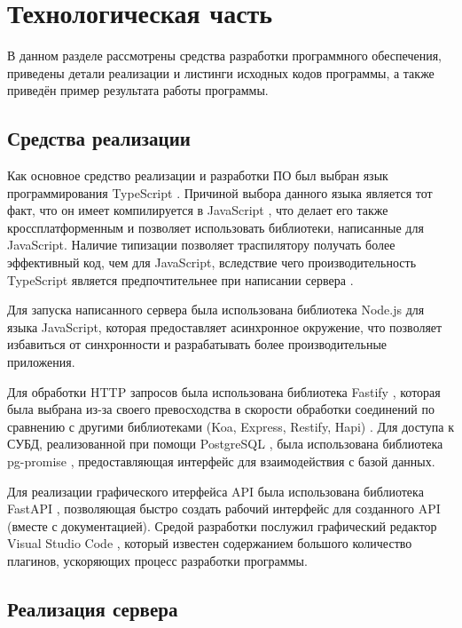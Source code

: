 \section{Технологическая часть}

В  данном  разделе  рассмотрены  средства  разработки  программного
обеспечения, приведены детали реализации и листинги исходных кодов
программы, а также приведён пример результата работы программы.

\subsection{Средства реализации}
Как  основное  средство  реализации  и  разработки  ПО  был  выбран  язык
программирования  TypeScript \cite{ts}.
Причиной  выбора  данного  языка  является  тот факт,  что  он  имеет компилируется в JavaScript \cite{js}, что делает его также кроссплатформенным и позволяет использовать библиотеки, написанные для JavaScript. 
Наличие типизации позволяет траспилятору получать более эффективный код, чем для JavaScript, вследствие чего производительность TypeScript является предпочтительнее при написании сервера \cite{ts-vs-js}.

Для запуска написанного сервера была использована библиотека Node.js \cite{nodejs} для языка JavaScript, которая предоставляет асинхронное окружение, что позволяет избавиться от синхронности и разрабатывать более производительные приложения.

Для обработки HTTP запросов была использована библиотека Fastify \cite{fastify}, которая была выбрана из-за своего превосходства в скорости обработки соединений по сравнению с другими библиотеками (Koa, Express, Restify, Hapi) \cite{fastify-benchmarks}.
Для доступа к СУБД, реализованной при помощи PostgreSQL \cite{postgres}, была использована библиотека pg-promise \cite{pg-promise}, предоставляющая интерфейс для взаимодействия с базой данных.

Для реализации графического итерфейса API была использована библиотека FastAPI \cite{fastapi}, позволяющая быстро создать рабочий интерфейс для созданного API (вместе с документацией).
Средой разработки  послужил  графический  редактор  Visual  Studio  Code \cite{vscode},  который известен  содержанием  большого  количество  плагинов,  ускоряющих  процесс разработки  программы.


\subsection{Реализация сервера}

